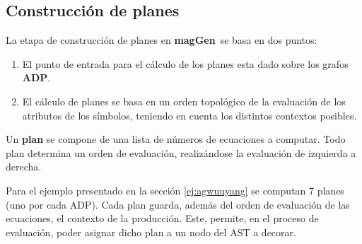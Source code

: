 \documentclass[runningheads,a4paper]{llncs}
\newcommand{\textbtt}[1]{\texttt{\textbf{#1}}}
\newcommand{\maggen}{\textbf{magGen}}
\begin{document}


%
%
%

\subsection{Construcción de planes}
\label{subsec:const-planes}
\vspace{-0.22cm}
La etapa de construcción de planes en \maggen\ se basa en dos puntos:

\begin{enumerate}
\item El punto de entrada para el cálculo de los planes esta dado sobre los grafos \textbf{ADP}. 
\item El cálculo de planes se basa en un orden topológico de la evaluación de los atributos de los símbolos, teniendo en cuenta los distintos contextos posibles.
\end{enumerate}

Un \textbf{plan} se compone de una lista de números de ecuaciones a computar. Todo plan determina un orden de evaluación, realizándose la evaluación de izquierda a derecha.


Para el ejemplo presentado en la sección \ref{ej:agwuuyang} se computan 7 planes (uno por cada ADP). Cada plan guarda, además del orden de evaluación de las ecuaciones, el contexto de la producción. Este, permite, en el proceso de evaluación, poder asignar dicho plan a un nodo del AST a decorar.
\end{document}

